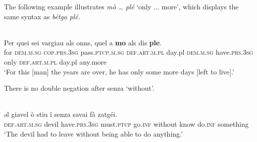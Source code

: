 The following example illustrates \textit{mò … plé} `only ... more', which displays the same syntax as \textit{bétga plé}.

\ea\label{}
\\
\gll   Per quei sei vargiau als onns, quel a \textbf{mo} als dis \textbf{ple}.\\
    for \textsc{dem.m.sg} \textsc{cop.prs.3sg} pass.\textsc{ptcp.m.sg} \textsc{def.art.m.pl} day.{pl} \textsc{dem.m.sg} have.\textsc{prs.3sg} only \textsc{def.art.m.pl} day.{pl} any.more \\
\glt `For this [man] the years are over, he has only some more days [left to live].'
\z



There is no double negation after senza ‘without’.

\ea\label{}
 {\citealt[147]{Büchli1966}}\\
\gll    ǝl giavel ò stiu î senza savai fâ zatgéi.\\
      \textsc{def.art.m.sg} devil have.\textsc{prs.3sg} must.\textsc{ptcp} go.\textsc{inf} without know do.\textsc{inf} something \\
\glt `The devil had to leave without being able to do anything.'
\z






